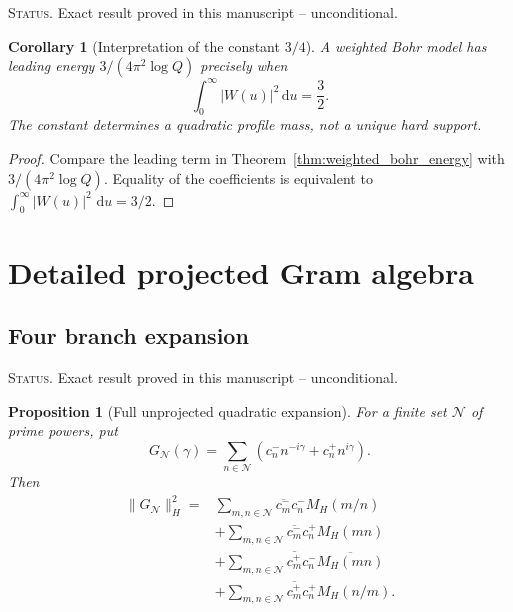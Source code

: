 \documentclass[11pt]{amsart}
\numberwithin{equation}{section}
\theoremstyle{plain}
\newtheorem{proposition}[theorem]{Proposition}
\newtheorem{corollary}[theorem]{Corollary}
\theoremstyle{definition}
\theoremstyle{remark}
\newcommand{\1}{\mathbf{1}}
\newcommand{\dd}{\,\mathrm{d}}
\newcommand{\statusnote}[1]{%
  \par\smallskip\noindent
  \begingroup\footnotesize\textsc{Status.} #1\endgroup
  \par\smallskip}
\begin{document}
\statusnote{Exact result proved in this manuscript -- unconditional.}
\begin{corollary}[Interpretation of the constant \(3/4\)]
\label{cor:three_quarter_profile_mass}
A weighted Bohr model has leading energy
$3/(4\pi^2\log Q)$ precisely when
\begin{equation}
\int_0^\infty|W(u)|^2\dd u
=
\frac32.
\label{eq:profile_mass_three_half}
\end{equation}
The constant determines a quadratic profile mass, not a unique hard support.
\end{corollary}

\begin{proof}
Compare the leading term in
Theorem~\ref{thm:weighted_bohr_energy} with
\(3/(4\pi^2\log Q)\).  Equality of the coefficients is equivalent to
\(\int_0^\infty|W(u)|^2\,\dd u=3/2\).
\end{proof}

\section{Detailed projected Gram algebra}
\label{sec:detailed_gram_algebra}

\subsection{Four branch expansion}
\label{subsec:four_branch_expansion}

\statusnote{Exact result proved in this manuscript -- unconditional.}
\begin{proposition}[Full unprojected quadratic expansion]
\label{prop:full_four_branch_expansion}
For a finite set $\mathcal N$ of prime powers, put
\begin{equation}
G_{\mathcal N}(\gamma)
=
\sum_{n\in\mathcal N}
\left(c_n^-n^{-i\gamma}+c_n^+n^{i\gamma}\right).
\label{eq:G_N_set}
\end{equation}
Then
\begin{align}
\|G_{\mathcal N}\|_H^2
={}&
\sum_{m,n\in\mathcal N}
\overline{c_m^-}c_n^-M_H(m/n)
\label{eq:four_branch_mm}
\\
&+
\sum_{m,n\in\mathcal N}
\overline{c_m^-}c_n^+M_H(mn)
\label{eq:four_branch_mp}
\\
&+
\sum_{m,n\in\mathcal N}
\overline{c_m^+}c_n^-\overline{M_H(mn)}
\label{eq:four_branch_pm}
\\
&+
\sum_{m,n\in\mathcal N}
\overline{c_m^+}c_n^+M_H(n/m).
\label{eq:four_branch_pp}
\end{align}
\end{proposition}
\end{document}
